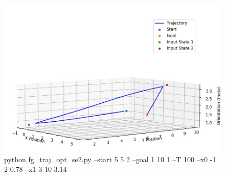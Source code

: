 \documentclass{article}
\begin{document}
\begin{figure} [H]
    \centering
    \includegraphics[width=0.5\linewidth]{latex_media/fg_traj_opt_se2_33.jpg}
    \caption{ python fg\_traj\_opt\_se2.py --start 5 5 2 --goal 1 10 1 --T 100 --x0 -1 2 0.78 --x1 3 10 3.14}
    
\end{figure}
\end{document}
